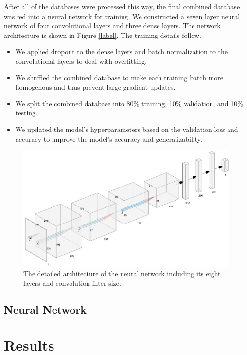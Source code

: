 \documentclass[conference]{IEEEtran}
\begin{document}
After all of the databases were processed this way, the final combined database was fed into a neural network for training. We constructed a seven layer neural network of four convolutional layers and three dense layers. The network architecture is shown in Figure \ref{label}. The training details follow.
\begin{itemize}
	\item We applied dropout to the dense layers and batch normalization to the convolutional layers to deal with overfitting.
	\item We shuffled the combined database to make each training batch more homogenous and thus prevent large gradient updates.
	\item We split the combined database into 80\% training, 10\% validation, and 10\% testing.
	\item We updated the model's hyperparameters based on the validation loss and accuracy to improve the model's accuracy and generalizability.
\end{itemize}

\begin{figure}[h!]
	\centering
	\hspace{6mm}
	\includegraphics[width=\linewidth]{neural_network_architecture.png}
	\caption{The detailed architecture of the neural network including its eight layers and convolution filter size.}
	\label{fig:high_level_dataflow_diagram}
\end{figure}

\subsection{Neural Network}

\section{Results}
\end{document}
